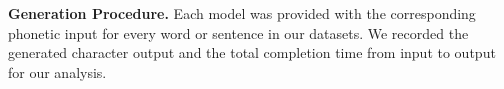 \documentclass[10pt, a4paper]{article}
\begin{document}
\textbf{Generation Procedure.}
Each model was provided with the corresponding phonetic input for every word or sentence in our datasets. We recorded the generated character output and the total completion time from input to output for our analysis.






\end{document}
